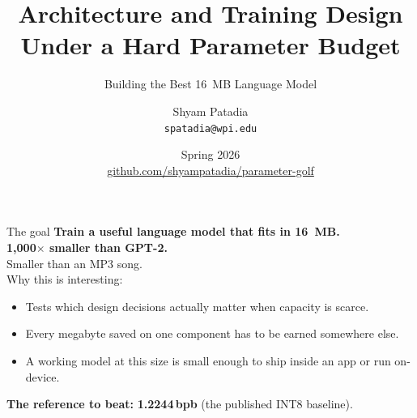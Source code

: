 \documentclass[aspectratio=169,10pt]{beamer}
\title{Architecture and Training Design \\ Under a Hard Parameter Budget}
\subtitle{Building the Best 16~MB Language Model}
\author{Shyam Patadia \\ \texttt{spatadia@wpi.edu}}
\institute{Worcester Polytechnic Institute \\ CS586: Big Data Analytics}
\date{Spring 2026 \\[0.4em] \footnotesize \href{https://github.com/shyampatadia/parameter-golf}{github.com/shyampatadia/parameter-golf}}
\newcommand{\hil}[1]{\textcolor{primary}{\textbf{#1}}}
\newcommand{\bpb}{\,bpb}
\begin{document}
\maketitle


\begin{frame}{The goal}
\centering
\vspace{0.3em}
\Large
\textbf{Train a useful language model that fits in 16~MB.}\\[1.0em]

\normalsize
\hil{1{,}000$\times$ smaller than GPT-2.}\\
Smaller than an MP3 song.\\[1.4em]

Why this is interesting:
\begin{itemize}
  \item Tests which design decisions actually matter when capacity is scarce.
  \item Every megabyte saved on one component has to be earned somewhere else.
  \item A working model at this size is small enough to ship inside an app
        or run on-device.
\end{itemize}

\vspace{0.8em}
\textbf{The reference to beat:} \hil{1.2244\bpb} (the published INT8 baseline).
\end{frame}
\end{document}
